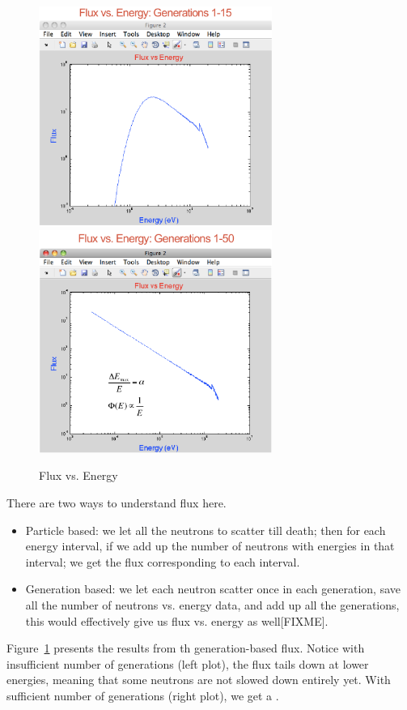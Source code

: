 \documentclass{school-22.211-notes}
\begin{document}
\begin{figure}[ht]
  \centering
  \includegraphics[width=3in]{images/sl-d/flux-vs-energy-1.png}
  \includegraphics[width=3in]{images/sl-d/flux-vs-energy-2.png}
  \caption{Flux vs. Energy} \label{fve}
\end{figure}
There are two ways to understand flux here. 
\begin{itemize}
\item Particle based: we let all the neutrons to scatter till death; then for each energy interval, if we add up the number of neutrons with energies in that interval; we get the flux corresponding to each interval.  
\item Generation based: we let each neutron scatter once in each generation, save all the number of neutrons vs. energy data, and add up all the generations, this would effectively give us flux vs. energy as well[FIXME]. 
\end{itemize}
Figure~\ref{fve} presents the results from th generation-based flux. Notice with insufficient number of generations (left plot), the flux tails down at lower energies, meaning that some neutrons are not slowed down entirely yet. With sufficient number of generations (right plot), we get a . 
\end{document}
